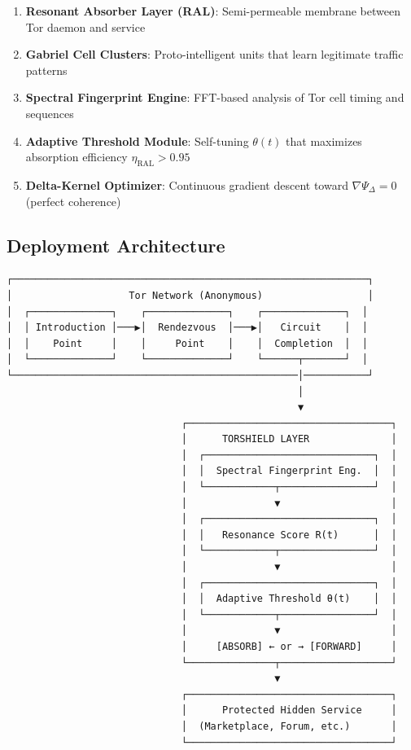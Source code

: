 \documentclass[11pt,a4paper]{article}
\begin{document}
\begin{enumerate}
\item \textbf{Resonant Absorber Layer (RAL)}: Semi-permeable membrane between Tor daemon and service
\item \textbf{Gabriel Cell Clusters}: Proto-intelligent units that learn legitimate traffic patterns
\item \textbf{Spectral Fingerprint Engine}: FFT-based analysis of Tor cell timing and sequences
\item \textbf{Adaptive Threshold Module}: Self-tuning $\theta(t)$ that maximizes absorption efficiency $\eta_{\text{RAL}} > 0.95$
\item \textbf{Delta-Kernel Optimizer}: Continuous gradient descent toward $\nabla\Psi_\Delta = 0$ (perfect coherence)
\end{enumerate}

\subsection{Deployment Architecture}

\begin{verbatim}
┌─────────────────────────────────────────────────────────────┐
│                    Tor Network (Anonymous)                  │
│  ┌──────────────┐    ┌──────────────┐    ┌──────────────┐  │
│  │ Introduction │───▶│  Rendezvous  │───▶│   Circuit    │  │
│  │    Point     │    │     Point    │    │  Completion  │  │
│  └──────────────┘    └──────────────┘    └──────┬───────┘  │
└─────────────────────────────────────────────────│───────────┘
                                                  │
                                                  ▼
                              ┌───────────────────────────────────┐
                              │      TORSHIELD LAYER              │
                              │  ┌─────────────────────────────┐  │
                              │  │  Spectral Fingerprint Eng.  │  │
                              │  └────────────┬────────────────┘  │
                              │               ▼                   │
                              │  ┌─────────────────────────────┐  │
                              │  │   Resonance Score R(t)      │  │
                              │  └────────────┬────────────────┘  │
                              │               ▼                   │
                              │  ┌─────────────────────────────┐  │
                              │  │  Adaptive Threshold θ(t)    │  │
                              │  └────────────┬────────────────┘  │
                              │               ▼                   │
                              │     [ABSORB] ← or → [FORWARD]     │
                              └───────────────┬───────────────────┘
                                              ▼
                              ┌───────────────────────────────────┐
                              │      Protected Hidden Service     │
                              │  (Marketplace, Forum, etc.)       │
                              └───────────────────────────────────┘
\end{verbatim}
\end{document}
